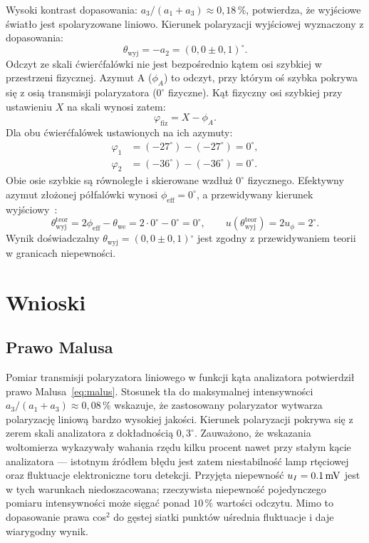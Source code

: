 \documentclass[12pt, a4paper]{article}
\begin{document}
Wysoki kontrast dopasowania: $a_3/(a_1+a_3) \approx 0{,}18\,\%$,
potwierdza, że wyjściowe światło jest spolaryzowane liniowo.
Kierunek polaryzacji wyjściowej wyznaczony z dopasowania:
\begin{equation}
    \theta_\text{wyj} = -a_2 = {(0{,}0 \pm 0{,}1)}^{\circ}.
\end{equation}
Odczyt ze skali ćwierćfalówki nie jest bezpośrednio kątem osi szybkiej w przestrzeni
fizycznej. Azymut A ($\phi_A$) to odczyt, przy którym oś szybka pokrywa się
z osią transmisji polaryzatora ($0^{\circ}$ fizyczne). Kąt fizyczny osi szybkiej
przy ustawieniu $X$ na skali wynosi zatem:
\begin{equation}
    \varphi_\text{fiz} = X - \phi_A.
    \label{eq:phi_fiz}
\end{equation}
Dla obu ćwierćfalówek ustawionych na ich azymuty:
\begin{align*}
    \varphi_1 &= (-27^{\circ}) - (-27^{\circ}) = 0^{\circ}, \\
    \varphi_2 &= (-36^{\circ}) - (-36^{\circ}) = 0^{\circ}.
\end{align*}
Obie osie szybkie są równoległe i skierowane wzdłuż $0^{\circ}$ fizycznego.
Efektywny azymut złożonej półfalówki wynosi $\phi_\text{eff} = 0^{\circ}$,
a przewidywany kierunek wyjściowy~\cite{skrypt}:
\begin{equation}
    \theta_\text{wyj}^\text{teor} = 2\phi_\text{eff} - \theta_\text{we}
        = 2\cdot 0^{\circ} - 0^{\circ} = 0^{\circ},
    \qquad u(\theta_\text{wyj}^\text{teor}) = 2u_\phi = 2^{\circ}.
\end{equation}
Wynik doświadczalny $\theta_\text{wyj} = (0{,}0 \pm 0{,}1){}^{\circ}$
jest zgodny z przewidywaniem teorii w granicach niepewności.

\section{Wnioski}

\subsection{Prawo Malusa}\label{sec:wnioski_malus}

Pomiar transmisji polaryzatora liniowego w funkcji kąta analizatora potwierdził
prawo Malusa~\eqref{eq:malus}. Stosunek tła do maksymalnej intensywności
$a_3/(a_1+a_3) \approx 0{,}08\,\%$ wskazuje, że zastosowany polaryzator wytwarza
polaryzację liniową bardzo wysokiej jakości. Kierunek polaryzacji pokrywa się z zerem
skali analizatora z dokładnością $0{,}3^{\circ}$.
Zauważono, że wskazania woltomierza wykazywały wahania rzędu kilku procent nawet
przy stałym kącie analizatora --- istotnym źródłem błędu jest zatem niestabilność
lamp rtęciowej oraz fluktuacje elektroniczne toru detekcji. Przyjęta niepewność
$u_I = \SI{0{,}1}{mV}$ jest w tych warunkach niedoszacowana; rzeczywista niepewność
pojedynczego pomiaru intensywności może sięgać ponad $10\,\%$ wartości odczytu.
Mimo to dopasowanie prawa cos$^2$ do gęstej siatki punktów uśrednia fluktuacje
i daje wiarygodny wynik.
\end{document}
